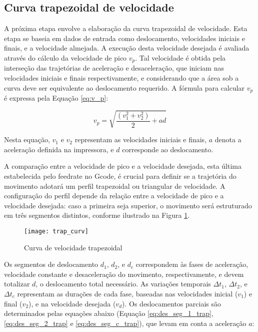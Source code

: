 \subsection{Curva trapezoidal de velocidade}

A próxima etapa  envolve a elaboração da curva trapezoidal de velocidade. Esta etapa se baseia em dados de entrada como deslocamento, velocidades iniciais e finais, e a velocidade almejada. A execução desta velocidade desejada é avaliada através do cálculo da velocidade de pico \(v_p\). Tal velocidade é obtida pela interseção das trajetórias de aceleração e desaceleração, que iniciam nas velocidades iniciais e finais respectivamente, e considerando que a área sob a curva deve ser equivalente ao deslocamento requerido. A fórmula para calcular \(v_p\) é expressa pela Equação \ref{eq:v_p}:

\begin{equation}
    \label{eq:v_p}
    v_p = \sqrt{\frac{(v_1^2+v_2^2)}{2}+a d}
\end{equation}

Nesta equação, \(v_1\) e \(v_2\) representam as velocidades iniciais e finais, \(a\) denota a aceleração definida na impressora, e \(d\) corresponde ao deslocamento.

A comparação entre a velocidade de pico e a velocidade desejada, esta última estabelecida pelo feedrate no Gcode, é crucial para definir se a trajetória do movimento adotará um perfil trapezoidal ou triangular de velocidade. A configuração do perfil depende da relação entre a velocidade de pico e a velocidade desejada: caso a primeira seja superior, o movimento será estruturado em três segmentos distintos, conforme ilustrado na Figura \ref{fig:trap_curv}.

\begin{figure}[H]
    \centering
    \caption{Curva de velocidade trapezoidal}
    \texttt{[image: trap\_curv]}
    \label{fig:trap_curv}
\end{figure}

Os segmentos de deslocamento \(d_1\), \(d_2\), e \(d_c\) correspondem às fases de aceleração, velocidade constante e desaceleração do movimento, respectivamente, e devem totalizar \(d\), o deslocamento total necessário. As variações temporais \(\Delta t_1\), \(\Delta t_2\), e \(\Delta t_c\) representam as durações de cada fase, baseadas nas velocidades inicial (\(v_1\)) e final (\(v_2\)), e na velocidade desejada (\(v_d\)). Os deslocamentos parciais são determinados pelas equações abaixo (Equação \ref{eq:des_seg_1_trap},  \ref{eq:des_seg_2_trap} e  \ref{eq:des_seg_c_trap}), que levam em conta a aceleração \(a\):

